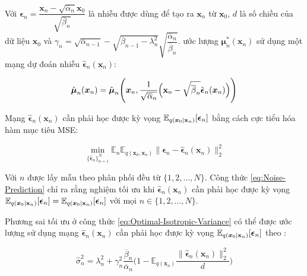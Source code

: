 \documentclass[14pt, a4paper]{article}
\numberwithin{equation}{section}
\numberwithin{figure}{section}
\numberwithin{dl}{section}
\numberwithin{md}{section}
\numberwithin{bd}{section}
\numberwithin{dn}{section}
\numberwithin{hq}{section}
\begin{document}
    Với $\boldsymbol{\epsilon}_n = \dfrac{\boldsymbol{x}_n - \sqrt{\overline{\alpha}_n} \boldsymbol{x}_0}{\sqrt{\overline{\beta}_n}}$ là nhiễu được dùng để tạo ra $\boldsymbol{x}_n$ từ $\boldsymbol{x}_0$, $d$ là số chiều của dữ liệu $\boldsymbol{x}_0$ và $\gamma_n = \sqrt{\overline{\alpha}_{n-1}} - \sqrt{\overline{\beta}_{n-1} - \lambda_n^2}\sqrt{\dfrac{\overline{\alpha}_n}{\overline{\beta}_n}}$.
    \cite{ho2020denoising} ước lượng $\boldsymbol{\mu}_n^{\ast} (\boldsymbol{x}_n)$ sử dụng một mạng dự đoán nhiễu $\hat{\boldsymbol{\epsilon}}_n (\boldsymbol{x}_n)$:

    \begin{equation} \label{eq:Estimated-Optimal-Mean}
        \hat{\boldsymbol{\mu}}_n(\boldsymbol{x}_n)=\tilde{\boldsymbol{\mu}}_n \Bigg( \boldsymbol{x}_n, \dfrac{1}{\sqrt{\overline{\alpha}_n}} \Big( \bold{x}_n - \sqrt{\overline{\beta}_n} \hat{\boldsymbol{\epsilon}}_n(\boldsymbol{x}_n) \Big) \Bigg)
    \end{equation}

    Mạng $\hat{\boldsymbol{\epsilon}}_n (\boldsymbol{x}_n)$ cần phải học được kỳ vọng $\mathbb{E}_{q( \boldsymbol{x}_0 \vert \bold{x}_n )} \lbrack \boldsymbol{\epsilon}_n \rbrack$ bằng cách cực tiểu hóa hàm mục tiêu MSE:

    \begin{equation} \label{eq:Noise-Prediction}
        \min_{\lbrace \hat{\boldsymbol{\epsilon}}_n  \rbrace_{n=1}^N} \mathbb{E}_n  \mathbb{E}_{q(\boldsymbol{x}_0, \boldsymbol{x}_n)} \lVert \boldsymbol{\epsilon}_n - \hat{\boldsymbol{\epsilon}}_n (\boldsymbol{x}_n) \rVert_2^2
    \end{equation}

    Với $n$ được lấy mẫu theo phân phối đều từ $\lbrace 1, 2, \dots, N \rbrace$.
    Công thức \ref{eq:Noise-Prediction} chỉ ra rằng nghiệm tối ưu khi $\hat{\boldsymbol{\epsilon}}_n (\boldsymbol{x}_n)$ cần phải học được kỳ vọng $\mathbb{E}_{q( \boldsymbol{x}_0 \vert \bold{x}_n )} \lbrack \boldsymbol{\epsilon}_n \rbrack = \mathbb{E}_{q( \boldsymbol{x}_0 \vert \bold{x}_n )} \lbrack \boldsymbol{\epsilon}_n \rbrack$ với mọi $n \in \lbrace 1, 2, \dots, N \rbrace$.

    Phương sai tối ưu ở công thức \ref{eq:Optimal-Isotropic-Variance} có thể được ước lượng sử dụng mạng $\hat{\boldsymbol{\epsilon}}_n (\boldsymbol{x}_n)$ cần phải học được kỳ vọng $\mathbb{E}_{q( \boldsymbol{x}_0 \vert \bold{x}_n )} \lbrack \boldsymbol{\epsilon}_n \rbrack$ theo \cite{bao2021analytic}:

    \begin{equation}
        \hat{\sigma}_n^{2}=\lambda_n^2 + \gamma_n^2 \dfrac{\overline{\beta}_n}{\overline{\alpha}_n} \Bigg( 1 - \mathbb{E}_{q(\boldsymbol{x}_n)} \dfrac{\lVert \hat{\boldsymbol{\epsilon}}_n (\boldsymbol{x}_n)\rVert_2^2}{d} \Bigg)
    \end{equation}
\end{document}
